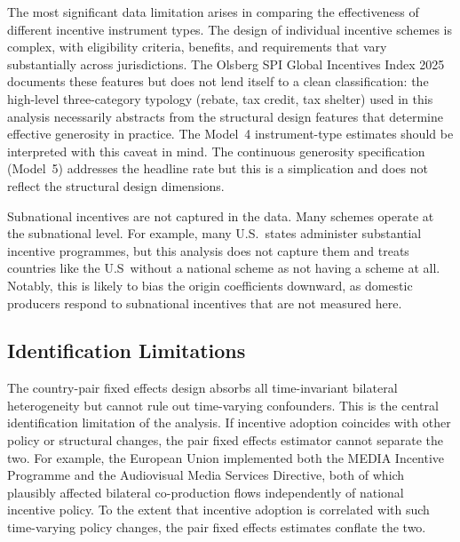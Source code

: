 The most significant data limitation arises in comparing the effectiveness of different incentive instrument types. The design of individual incentive schemes is complex, with eligibility criteria, benefits, and requirements that vary substantially across jurisdictions. The Olsberg SPI Global Incentives Index 2025 documents these features but does not lend itself to a clean classification: the high-level three-category typology (rebate, tax credit, tax shelter) used in this analysis necessarily abstracts from the structural design features that determine effective generosity in practice. The Model~4 instrument-type estimates should be interpreted with this caveat in mind. The continuous generosity specification (Model~5) addresses the headline rate but this is a simplication and does not reflect the structural design dimensions.

Subnational incentives are not captured in the data. Many schemes operate at the subnational level. For example, many U.S.\ states administer substantial incentive programmes, but this analysis does not capture them and treats countries like the U.S\ without a national scheme as not having a scheme at all. Notably, this is likely to bias the origin coefficients downward, as domestic producers respond to subnational incentives that are not measured here.

\subsection{Identification Limitations}
\label{sec:lim_identification}

The country-pair fixed effects design absorbs all time-invariant bilateral heterogeneity but cannot rule out time-varying confounders. This is the central identification limitation of the analysis. If incentive adoption coincides with other policy or structural changes, the pair fixed effects estimator cannot separate the two. For example, the European Union implemented both the MEDIA Incentive Programme and the Audiovisual Media Services Directive, both of which plausibly affected bilateral co-production flows independently of national incentive policy. To the extent that incentive adoption is correlated with such time-varying policy changes, the pair fixed effects estimates conflate the two.

